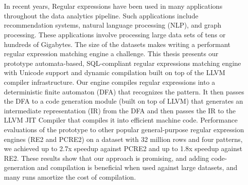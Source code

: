 \chapter{\abstractname}
In recent years, Regular expressions have been used in many applications throughout the data analytics pipeline. Such applications include recommendation systems, natural language processing (NLP), and graph processing. These applications involve processing large data sets of tens or hundreds of Gigabytes. The size of the datasets makes writing a performant regular expression matching engine a challenge. This thesis presents our prototype automata-based, SQL-compliant regular expressions matching engine with Unicode support and dynamic compilation built on top of the LLVM compiler infrastructure. Our engine compiles regular expressions into a deterministic finite automaton (DFA) that recognizes the pattern. It then passes the DFA to a code generation module (built on top of LLVM) that generates an intermediate representation (IR) from the DFA and then passes the IR to the LLVM JIT Compiler that compiles it into efficient machine code. Performance evaluations of the prototype to other popular general-purpose regular expression engines (RE2 and PCRE2) on a dataset with 32 million rows and four patterns, we achieved up to 2.7x speedup against PCRE2 and up to 1.8x speedup against RE2. These results show that our approach is promising, and adding code-generation and compilation is beneficial when used against large datasets, and many runs amortize the cost of compilation.